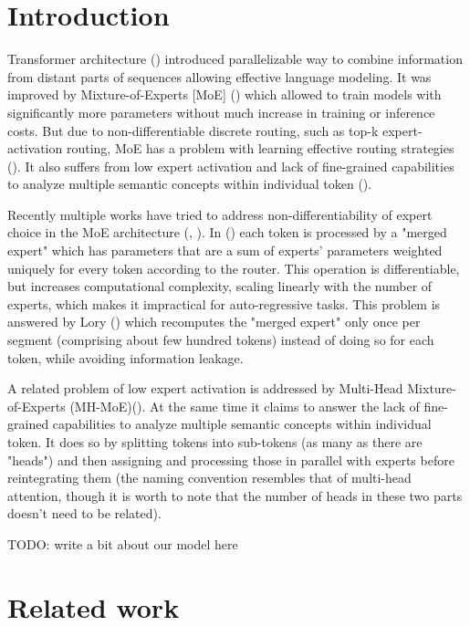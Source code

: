 \documentclass[12pt]{article}
\begin{document}
\section{Introduction}
Transformer architecture (\cite{vaswani2017attention}) introduced parallelizable way to combine information from distant parts of sequences allowing effective language modeling. It was improved by Mixture-of-Experts [MoE] (\cite{shazeer2017outrageously}) which allowed to train models with significantly more parameters without much increase in training or inference costs. But due to non-differentiable discrete routing, such as top-k expert-activation routing, MoE has a problem with learning effective routing strategies (\cite{muqeeth2023soft}). It also suffers from low expert activation and lack of fine-grained capabilities to analyze multiple semantic concepts within individual token (\cite{wu2024multihead}).

Recently multiple works have tried to address non-differentiability of expert choice in the MoE architecture (\cite{Puigcerver2023FromST}, \cite{muqeeth2023soft}). In (\cite{muqeeth2023soft}) each token is processed  by a "merged expert" which has parameters that are a sum of experts' parameters weighted uniquely for every token according to the router. This operation is differentiable, but increases computational complexity, scaling linearly with the number of experts, which makes it impractical for auto-regressive tasks. This problem is answered by Lory (\cite{zhong2024lory}) which recomputes the "merged expert" only once per segment (comprising about few hundred tokens) instead of doing so for each token, while avoiding information leakage.

A related problem of low expert activation is addressed by Multi-Head Mixture-of-Experts (MH-MoE)(\cite{wu2024multihead}). At the same time it claims to answer the lack of fine-grained capabilities to analyze multiple semantic concepts within individual token. 
It does so by splitting tokens into sub-tokens (as many as there are "heads") and then assigning and processing those in parallel with experts before reintegrating them (the naming convention resembles that of multi-head attention, though it is worth to note that the number of heads in these two parts doesn't need to be related).

TODO: write a bit about our model here


    
\section{Related work}
\end{document}
